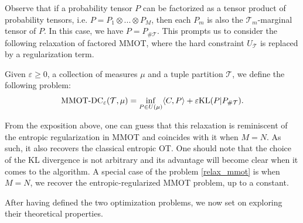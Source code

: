 Observe that if a probability tensor $P$ can be factorized as a tensor product of probability tensors, i.e.
$P = P_1 \otimes ... \otimes P_M$, then each $P_m$ is also the $\mathcal T_m$-marginal tensor of $P$. In this case,
we have $P = P_{\# \mathcal T}$. This prompts us to consider the following relaxation of factored MMOT, where the hard constraint
$U_{\mathcal T}$ is replaced by a regularization term.
\begin{definition}
  Given $\varepsilon \geq 0$, a collection of measures $\mu$ and a tuple partition $\mathcal T$,
  we define the following problem:
  \begin{equation} \label{relax_mmot}
    \text{MMOT-DC}_{\varepsilon}( \mathcal T, \mu) =
    \inf_{P \in U(\mu)} \langle C, P \rangle + \varepsilon \text{KL}(P \vert P_{\# \mathcal T}).
  \end{equation}
\end{definition}
From the exposition above, one can guess that this relaxation is reminiscent of the entropic regularization in MMOT and
coincides with it when $M = N$. As such, it also recovers the classical entropic OT. One should note that the choice of the KL
divergence is not arbitrary and its advantage will become clear when it comes to the algorithm. %
A special case of the problem \ref{relax_mmot} is when $M = N$, we recover the entropic-regularized MMOT problem, up to a constant.

After having defined the two optimization problems, we now set on exploring their theoretical properties.

